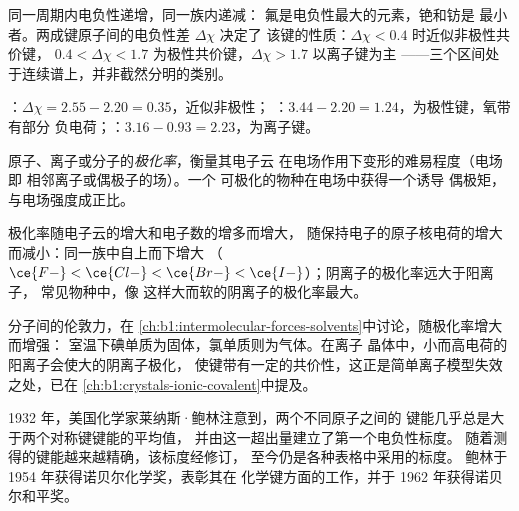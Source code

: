 \begin{proposition}[电负性的变化趋势]\label{prop:b1:periodicity:en-trend}
同一周期内电负性递增，同一族内递减：
氟是电负性最大的元素，铯和钫是
最小者。两成键原子间的电负性差 $\Delta\chi$ 决定了
该键的性质：$\Delta\chi < 0.4$ 时近似非极性共价键，
$0.4 < \Delta\chi < 1.7$ 为极性共价键，$\Delta\chi > 1.7$ 以离子键为主
——三个区间处于连续谱上，并非截然分明的类别。
\end{proposition}

\begin{example}[三种键]\label{ex:b1:periodicity:bonds}
：$\Delta\chi = 2.55 - 2.20 = 0.35$，近似非极性；
：$3.44 - 2.20 = 1.24$，为极性键，氧带有部分
负电荷；：$3.16 - 0.93 = 2.23$，为离子键。
\end{example}

\begin{definition}[极化率]\label{def:b1:periodicity:polarisability}
原子、离子或分子的\emph{极化率}，衡量其电子云
在电场作用下变形的难易程度（电场即
相邻离子或偶极子的场）。一个
可极化的物种在电场中获得一个诱导
偶极矩，与电场强度成正比。
\end{definition}

\begin{proposition}[极化率的变化趋势]\label{prop:b1:periodicity:polarisability-trend}
极化率随电子云的增大和电子数的增多而增大，
随保持电子的原子核电荷的增大而减小：同一族中自上而下增大
（$\ce{F-} < \ce{Cl-} < \ce{Br-} <
\ce{I-}$）；阴离子的极化率远大于阳离子，
常见物种中，像  这样大而软的阴离子的极化率最大。
\end{proposition}

\begin{example}[极化率为何重要]\label{ex:b1:periodicity:pol}
分子间的伦敦力，在
\cref{ch:b1:intermolecular-forces-solvents}中讨论，随极化率增大而增强：
室温下碘单质为固体，氯单质则为气体。在离子
晶体中，小而高电荷的阳离子会使大的阴离子极化，
使键带有一定的共价性，这正是简单离子模型失效之处，已在
\cref{ch:b1:crystals-ionic-covalent}中提及。
\end{example}

\begin{history}[鲍林标度，1932 年]
1932 年，美国化学家莱纳斯·鲍林注意到，两个不同原子之间的
键能几乎总是大于两个对称键键能的平均值，
并由这一超出量建立了第一个电负性标度。
随着测得的键能越来越精确，该标度经修订，
至今仍是各种表格中采用的标度。
鲍林于 1954 年获得诺贝尔化学奖，表彰其在
化学键方面的工作，并于 1962 年获得诺贝尔和平奖。
\end{history}


